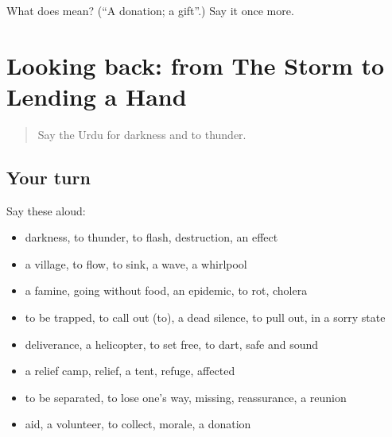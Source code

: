 \begin{tcolorbox}[breakable,colback=teal!4,colframe=teal!35!black,title={Before you move on}]
What does  mean? (\textquotedblleft{}A donation; a gift\textquotedblright{}.) Say it once more.
\end{tcolorbox}
\section[(dialogue)]{Looking back: from The Storm to Lending a Hand}

\label{lesson:UR-R299-review-292-299}



\begin{quote}
Say the Urdu for darkness and to thunder.
\end{quote}

\subsection*{Your turn}
Say these aloud:

\begin{itemize}
\raggedright
  \item darkness, to thunder, to flash, destruction, an effect
  \item a village, to flow, to sink, a wave, a whirlpool
  \item a famine, going without food, an epidemic, to rot, cholera
  \item to be trapped, to call out (to), a dead silence, to pull out, in a sorry state
  \item deliverance, a helicopter, to set free, to dart, safe and sound
  \item a relief camp, relief, a tent, refuge, affected
  \item to be separated, to lose one's way, missing, reassurance, a reunion
  \item aid, a volunteer, to collect, morale, a donation
\end{itemize}

